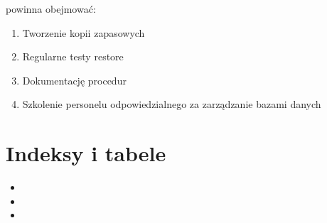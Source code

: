 \documentclass[letterpaper,10pt,polish]{sphinxmanual}
\begin{document}
\sphinxAtStartPar
{} powinna obejmować:
\begin{enumerate}
%
\item {} 
\sphinxAtStartPar
Tworzenie kopii zapasowych

\item {} 
\sphinxAtStartPar
Regularne testy restore

\item {} 
\sphinxAtStartPar
Dokumentację procedur

\item {} 
\sphinxAtStartPar
Szkolenie personelu odpowiedzialnego za zarządzanie bazami danych

\end{enumerate}


\chapter{Indeksy i tabele}
\label{\detokenize{index:indeksy-i-tabele}}\begin{itemize}
\item {} 
\sphinxAtStartPar
{}

\item {} 
\sphinxAtStartPar
{}

\item {} 
\sphinxAtStartPar
{}

\end{itemize}



\renewcommand{\indexname}{Indeks}
\printindex
\end{document}
